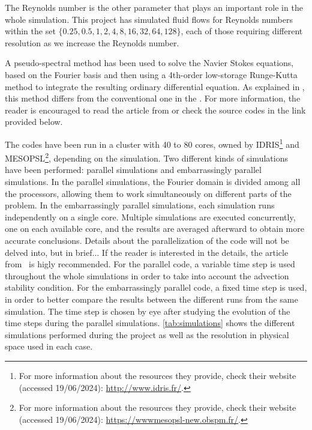 \documentclass[../main.tex]{subfiles}
\begin{document}
The Reynolds number is the other parameter that plays an important role in the whole simulation. This project has simulated fluid flows for Reynolds numbers within the set $\{0.25, 0.5, 1, 2, 4, 8, 16, 32, 64, 128\}$, each of those requiring different resolution as we increase the Reynolds number.

A pseudo-spectral method has been used to solve the Navier Stokes equations, based on the Fourier basis and then using a 4th-order low-storage Runge-Kutta method to integrate the resulting ordinary differential equation. As explained in \cite{rungekutta}, this method differs from the conventional one in the . For more information, the reader is encouraged to read the article from \cite{rungekutta} or check the source codes in the link provided below.

The codes have been run in a cluster with 40 to 80 cores, owned by IDRIS\footnote{For more information about the resources they provide, check their website (accessed 19/06/2024): \url{http://www.idris.fr/}.} and MESOPSL\footnote{For more information about the resources they provide, check their website (accessed 19/06/2024): \url{https://wwwmesopsl-new.obspm.fr/}.}, depending on the simulation. Two different kinds of simulations have been performed: parallel simulations and embarrassingly parallel simulations. In the parallel simulations, the Fourier domain is divided among all the processors, allowing them to work simultaneously on different parts of the problem. In the embarrassingly parallel simulations, each simulation runs independently on a single core. Multiple simulations are executed concurrently, one on each available core, and the results are averaged afterward to obtain more accurate conclusions. Details about the parallelization of the code will not be delved into, but in brief... If the reader is interested in the details, the article from~\cite{mpi} is higly recommended. For the parallel code, a variable time step is used throughout the whole simulations in order to take into account the advection stability condition. For the embarrassingly parallel code, a fixed time step is used, in order to better compare the results between the different runs from the same simulation. The time step is chosen by eye after studying the evolution of the time steps during the parallel simulations. \cref{tab:simulations} shows the different simulations performed during the project as well as the resolution in physical space used in each case.
\end{document}
